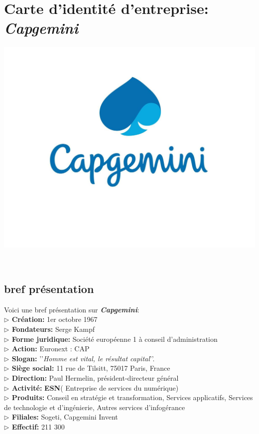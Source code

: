 \documentclass[a4paper, 12pt,french,oneside]{book}%
\theoremstyle{definition}
\theoremstyle{remark}
\begin{document}
\chapter{Carte d'identité d'entreprise: \textit{Capgemini}}
\begin{minipage}{\linewidth}
	\centering
		\includegraphics[keepaspectratio=true,scale=0.2]{image/cap}
\end{minipage}\vspace{0.3cm}\\

\section{bref présentation}
Voici une bref présentation sur \textbf{\textit{Capgemini}}:\\
\textbf{$\rhd$ Création:} 1er octobre 1967\\
\textbf{$\rhd$ Fondateurs:} Serge Kampf\\
\textbf{$\rhd$ Forme juridique:} Société européenne 1 à conseil d'administration\\
\textbf{$\rhd$ Action:} Euronext : CAP\\
\textbf{$\rhd$ Slogan:} ’’\textit{Homme est vital, le résultat capital}’’.\\
\textbf{$\rhd$ Siège social:} 11 rue de Tilsitt, 75017 Paris, France\\
\textbf{$\rhd$ Direction:} Paul Hermelin, président-directeur général\\
\textbf{$\rhd$ Activité:} \textbf{ESN}( Entreprise de services du numérique)\\
\textbf{$\rhd$ Produits:} Conseil en stratégie et transformation, Services applicatifs, Services de technologie et d'ingénierie, Autres services d'infogérance \\
\textbf{$\rhd$ Filiales:} Sogeti, Capgemini Invent\\
\textbf{$\rhd$ Effectif:} 	211 300\\
\end{document}
